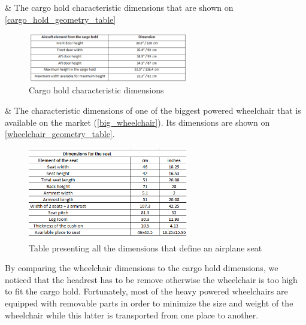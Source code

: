 \begin{easylist}

& The cargo hold characteristic dimensions that are shown on \ref{cargo_hold_geometry_table} 

\begin{figure}[h]
\centering
\includegraphics[width=7cm]{images/cargo_hold_geometry_table.png}
\caption{Cargo hold characteristic dimensions}
\label{fig: cargo_hold_geometry_table }
\end{figure}

& The characteristic dimensions of one of the biggest powered wheelchair that is available on the market (\ref{big_wheelchair}). Its dimensions are shown on \ref{wheelchair_geometry_table}.


\begin{figure}[h]
\centering
\includegraphics[width=7cm]{images/seat_dimensions_table.png}
\caption{Table presenting all the dimensions that define an airplane seat}
\label{fig: seat_dimensions_table}
\end{figure}

\end{easylist}

By comparing the wheelchair dimensions to the cargo hold dimensions, we noticed that the headrest has to be remove otherwise the wheelchair is too high to fit the cargo hold. Fortunately, most of the heavy powered wheelchairs are equipped with removable parts in order to minimize the size and weight of the wheelchair while this latter is transported from one place to another.

